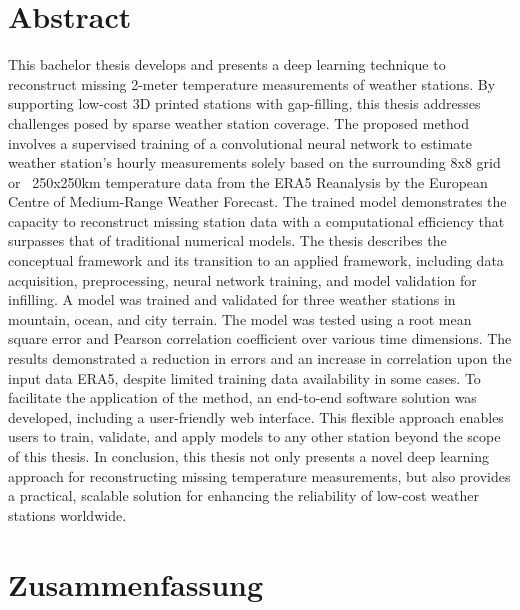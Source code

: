\section*{Abstract}
\label{sec: abstract}

This bachelor thesis develops and presents a deep learning technique to reconstruct missing 2-meter temperature measurements of weather stations.
By supporting low-cost 3D printed stations with gap-filling, this thesis addresses challenges posed by sparse weather station coverage.
The proposed method involves a supervised training of a convolutional neural network to estimate weather station's hourly measurements solely based on the surrounding 8x8 grid or ~250x250km temperature data from the ERA5 Reanalysis by the European Centre of Medium-Range Weather Forecast.
The trained model demonstrates the capacity to reconstruct missing station data with a computational efficiency that surpasses that of traditional numerical models.
The thesis describes the conceptual framework and its transition to an applied framework, including data acquisition, preprocessing, neural network training, and model validation for infilling.
A model was trained and validated for three weather stations in mountain, ocean, and city terrain. The model was tested using a root mean square error and Pearson correlation coefficient over various time dimensions.
The results demonstrated a reduction in errors and an increase in correlation upon the input data ERA5, despite limited training data availability in some cases. To facilitate the application of the method, an end-to-end software solution was developed, including a user-friendly web interface.
This flexible approach enables users to train, validate, and apply models to any other station beyond the scope of this thesis.
In conclusion, this thesis not only presents a novel deep learning approach for reconstructing missing temperature measurements, but also provides a practical, scalable solution for enhancing the reliability of low-cost weather stations worldwide.

\newpage

\section*{Zusammenfassung}

